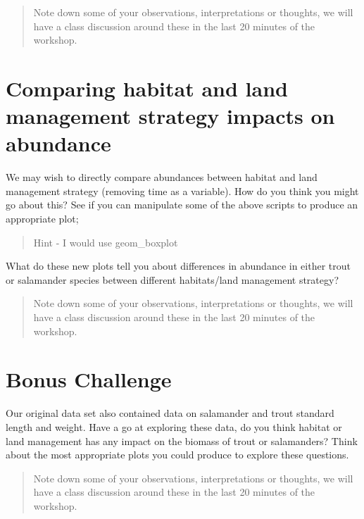 \documentclass[
]{book}
\begin{document}
\begin{quote}
Note down some of your observations, interpretations or thoughts, we will have a class discussion around these in the last 20 minutes of the workshop.
\end{quote}

\hypertarget{comparing-habitat-and-land-management-strategy-impacts-on-abundance}{%
\section{Comparing habitat and land management strategy impacts on abundance}\label{comparing-habitat-and-land-management-strategy-impacts-on-abundance}}

We may wish to directly compare abundances between habitat and land management strategy (removing time as a variable). How do you think you might go about this? See if you can manipulate some of the above scripts to produce an appropriate plot;

\begin{quote}
Hint - I would use geom\_boxplot
\end{quote}

What do these new plots tell you about differences in abundance in either trout or salamander species between different habitats/land management strategy?

\begin{quote}
Note down some of your observations, interpretations or thoughts, we will have a class discussion around these in the last 20 minutes of the workshop.
\end{quote}

\hypertarget{bonus-challenge}{%
\section{Bonus Challenge}\label{bonus-challenge}}

Our original data set also contained data on salamander and trout standard length and weight. Have a go at exploring these data, do you think habitat or land management has any impact on the biomass of trout or salamanders? Think about the most appropriate plots you could produce to explore these questions.

\begin{quote}
Note down some of your observations, interpretations or thoughts, we will have a class discussion around these in the last 20 minutes of the workshop.
\end{quote}
\end{document}
